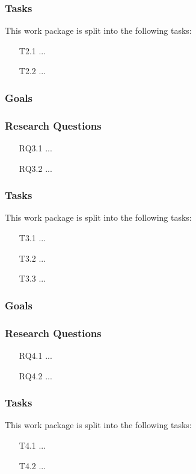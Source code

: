 \subsubsection{Tasks}
This work package is split into the following tasks:
\begin{itemize}
	\item[T2.1] ...
	\item[T2.2] ...
\end{itemize}


\subsubsection{Goals}


\subsubsection{Research Questions}
\begin{itemize}
	\item[RQ3.1] ...
	\item[RQ3.2] ...
\end{itemize}

\subsubsection{Tasks}
This work package is split into the following tasks:
\begin{itemize}
	\item[T3.1] ...
	\item[T3.2] ...
	\item[T3.3] ...
\end{itemize}


\subsubsection{Goals}


\subsubsection{Research Questions}
\begin{itemize}
	\item[RQ4.1] ...
	\item[RQ4.2] ...
\end{itemize}

\subsubsection{Tasks}
This work package is split into the following tasks:
\begin{itemize}
	\item[T4.1] ...
	\item[T4.2] ...
\end{itemize}


